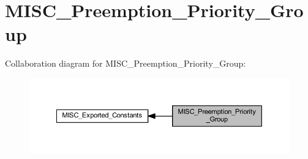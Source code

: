 \hypertarget{group___m_i_s_c___preemption___priority___group}{}\section{M\+I\+S\+C\+\_\+\+Preemption\+\_\+\+Priority\+\_\+\+Group}
\label{group___m_i_s_c___preemption___priority___group}
Collaboration diagram for M\+I\+S\+C\+\_\+\+Preemption\+\_\+\+Priority\+\_\+\+Group\+:
\nopagebreak
\begin{figure}[H]
\begin{center}
\leavevmode
\includegraphics[width=350pt]{group___m_i_s_c___preemption___priority___group}
\end{center}
\end{figure}
